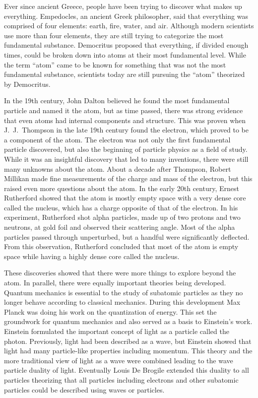 Ever since ancient Greece, people have been trying to discover what makes up everything. Empedocles, an ancient Greek philosopher, said that everything was comprised of four elements: earth, fire, water, and air. Although modern scientists use more than four elements, they are still trying to categorize the most fundamental substance. Democritus proposed that everything, if divided enough times, could be broken down into atoms at their most fundamental level. While the term ``atom'' came to be known for something that was not the most fundamental substance, scientists today are still pursuing the ``atom'' theorized by Democritus.

In the 19th century, John Dalton believed he found the most fundamental particle and named it the atom, but as time passed, there was strong evidence that even atoms had internal components and structure. This was proven when J.~J.~Thompson in the late 19th century found the electron, which proved to be a component of the atom. The electron was not only the first fundamental particle discovered, but also the beginning of particle physics as a field of study. While it was an insightful discovery that led to many inventions, there were still many unknowns about the atom. About a decade after Thompson, Robert Millikan made fine measurements of the charge and mass of the electron, but this raised even more questions about the atom. In the early 20th century, Ernest Rutherford showed that the atom is mostly empty space with a very dense core called the nucleus, which has a charge opposite of that of the electron. In his experiment, Rutherford shot alpha particles, made up of two protons and two neutrons, at gold foil and observed their scattering angle. Most of the alpha particles passed through unperturbed, but a handful were significantly deflected. From this observation, Rutherford concluded that most of the atom is empty space while having a highly dense core called the nucleus. 

These discoveries showed that there were more things to explore beyond the atom. In parallel, there were equally important theories being developed. Quantum mechanics is essential to the study of subatomic particles as they no longer behave according to classical mechanics. During this development Max Planck was doing his work on the quantization of energy. This set the groundwork for quantum mechanics and also served as a basis to Einstein's work. Einstein formulated the important concept of light as a particle called the photon. Previously, light had been described as a wave, but Einstein showed that light had many particle-like properties including momentum. This theory and the more traditional view of light as a wave were combined leading to the wave particle duality of light. Eventually Louis De Brogile extended this duality to all particles theorizing that all particles including electrons and other subatomic particles could be described using waves or particles.

